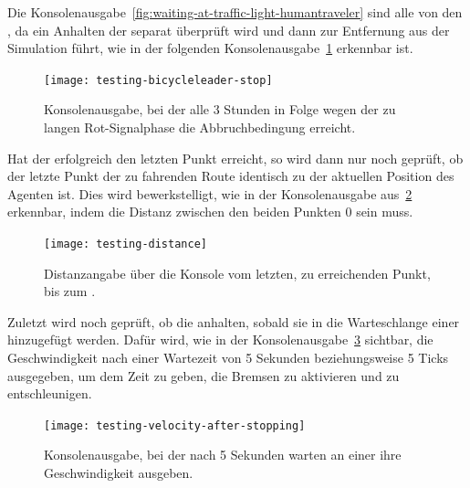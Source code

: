 Die Konsolenausgabe~\ref{fig:waiting-at-traffic-light-humantraveler} sind alle von den , da ein Anhalten der  separat überprüft wird und dann zur Entfernung aus der Simulation führt, wie in der folgenden Konsolenausgabe~\ref{fig:waiting-at-traffic-light-bicycleleader} erkennbar ist.

\begin{figure}[h]
    \centering
    \texttt{[image: testing-bicycleleader-stop]}~\caption{Konsolenausgabe, bei der  alle 3 Stunden in Folge wegen der zu langen Rot-Signalphase die Abbruchbedingung erreicht.}
    \label{fig:waiting-at-traffic-light-bicycleleader}
\end{figure}

Hat der  erfolgreich den letzten Punkt erreicht, so wird dann nur noch geprüft, ob der letzte Punkt der zu fahrenden Route identisch zu der aktuellen Position des Agenten ist.
Dies wird bewerkstelligt, wie in der Konsolenausgabe aus~\ref{fig:testing-successful-trip} erkennbar, indem die Distanz zwischen den beiden Punkten 0 sein muss.

\begin{figure}[h]
    \centering
    \texttt{[image: testing-distance]}~\caption{Distanzangabe über die Konsole vom letzten, zu erreichenden Punkt, bis zum .}
    \label{fig:testing-successful-trip}
\end{figure}


Zuletzt wird noch geprüft, ob die  anhalten, sobald sie in die Warteschlange einer  hinzugefügt werden.
Dafür wird, wie in der Konsolenausgabe~\ref{fig:human-traveler-slowing-down} sichtbar, die Geschwindigkeit nach einer Wartezeit von 5 Sekunden beziehungsweise 5 Ticks ausgegeben, um dem  Zeit zu geben, die Bremsen zu aktivieren und zu entschleunigen.

\begin{figure}[h]
    \centering
    \texttt{[image: testing-velocity-after-stopping]}~\caption{Konsolenausgabe, bei der  nach 5 Sekunden warten an einer  ihre Geschwindigkeit ausgeben.}
    \label{fig:human-traveler-slowing-down}
\end{figure}
